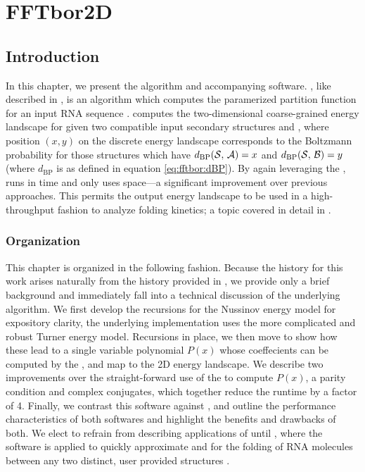 
\chapter{FFTbor2D}
\label{ch:ffttwo}


\section{Introduction}
\label{sec:ffttwo:intro}

In this chapter, we present the \ffttwo algorithm and accompanying software.
\ffttwo, like \fftbor described in , is an algorithm
which computes the paramerized partition function for an input RNA sequence
\seq. \ffttwo computes the two-dimensional coarse-grained energy landscape for \seq
given two compatible input secondary structures \strA and \strB, where position
$(x,y)$ on the discrete energy landscape corresponds to the Boltzmann
probability for those structures \str which have $d_{\text{BP}}(\mathcal S,\,\mathcal A)=x$ and
$d_{\text{BP}}(\mathcal S,\,\mathcal B)=y$ (where $d_{\text{BP}}$ is as defined in
equation \ref{eq:fftbor:dBP}). By again leveraging the \fft, \ffttwo runs in 
time and only uses  space---a significant improvement over previous
approaches. This permits the output energy landscape to be used in a
high-throughput fashion to analyze folding kinetics; a topic covered in detail
in .

\subsection{Organization}
\label{subsec:ffttwo:org}

This chapter is organized in the following fashion. Because the history for
this work arises naturally from the history provided in
, we provide only a brief background
and immediately fall into
a technical discussion of the underlying algorithm. We first develop the
recursions for the Nussinov energy model for expository clarity, the
underlying implementation uses the more complicated and robust Turner energy
model. Recursions in place, we then move to show how these lead to
a single variable polynomial $P(x)$ whose coeffecients can be computed by
the \idft, and map to the 2D energy landscape. We describe two improvements over
the straight-forward use of the \fft to compute $P(x)$,
a parity condition and complex conjugates, which together reduce the
runtime by a factor of 4. Finally, we contrast this software against \rnatwofold,
and outline the performance characteristics of both softwares and highlight
the benefits and drawbacks of both. We elect to refrain from describing
applications of \ffttwo until , where the software is
applied to quickly approximate \mfpt and \eqt for the folding of RNA molecules
between any two distinct, user provided structures \strAB.

